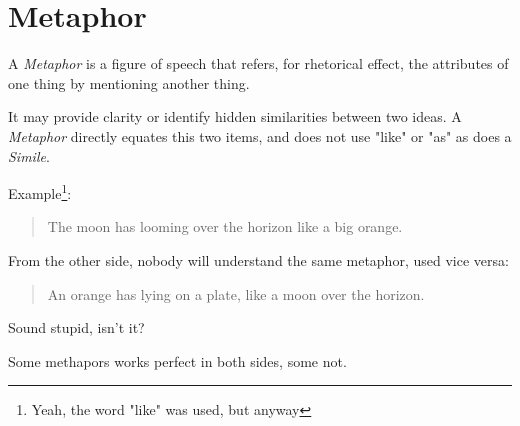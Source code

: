 \section{Metaphor}
\label{sec:Metaphor}

A \emph{Metaphor} is a figure of speech that refers, for rhetorical effect, the attributes of one thing by mentioning another thing.

It may provide clarity or identify hidden similarities between two ideas. A \textit{Metaphor} directly equates this two items, and does not use "like" or "as" as does a \textit{Simile}. 

Example\footnote{Yeah, the word "like" was used, but anyway}: 

\begin{verse}
The moon has looming over the horizon like a big orange. 
\end{verse} 

From the other side, nobody will understand the same metaphor, used vice versa:

\begin{verse}
An orange has lying on a plate, like a moon over the horizon. 
\end{verse} 

Sound stupid, isn't it?

Some methapors works perfect in both sides, some not.